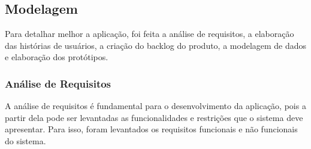 \documentclass[
    12pt,               %
    openright,          %
    oneside,
    a4paper,            %
    english,            %
    brazil              %
    ]{ifsp-spo-inf-ctds} %
\begin{document}
\subsection{Modelagem}
Para detalhar melhor a aplicação, foi feita a análise de requisitos, a elaboração das histórias de usuários, a criação do backlog do produto, a modelagem de dados e elaboração dos protótipos.

\subsubsection{Análise de Requisitos}
A análise de requisitos é fundamental para o desenvolvimento da aplicação, pois a partir dela pode ser levantadas as funcionalidades e restrições que o sistema deve apresentar. Para isso, foram levantados os requisitos funcionais e não funcionais do sistema.
\end{document}
